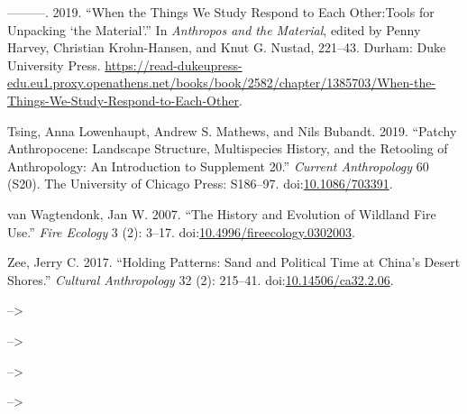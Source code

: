 \documentclass[
]{article}
\newlength{\cslhangindent}
\newenvironment{CSLReferences}[2] %
 {\begin{list}{}{%
  \setlength{\itemindent}{0pt}
  \setlength{\leftmargin}{0pt}
  \setlength{\parsep}{0pt}
  \ifodd #1
   \setlength{\leftmargin}{\cslhangindent}
   \setlength{\itemindent}{-1\cslhangindent}
  \fi
  \setlength{\itemsep}{#2\baselineskip}}}
 {\end{list}}
\begin{document}
\begin{CSLReferences}{1}{0}
---------. 2019. {``When the {Things We Study Respond} to {Each Other}:{Tools} for {Unpacking} {`the {Material}'}.''} In \emph{Anthropos and the {Material}}, edited by Penny Harvey, Christian Krohn-Hansen, and Knut G. Nustad, 221--43. Durham: Duke University Press. \url{https://read-dukeupress-edu.eu1.proxy.openathens.net/books/book/2582/chapter/1385703/When-the-Things-We-Study-Respond-to-Each-Other}.

Tsing, Anna Lowenhaupt, Andrew S. Mathews, and Nils Bubandt. 2019. {``Patchy {Anthropocene}: {Landscape Structure}, {Multispecies History}, and the {Retooling} of {Anthropology}: {An Introduction} to {Supplement} 20.''} \emph{Current Anthropology} 60 (S20). The University of Chicago Press: S186--97. doi:\href{https://doi.org/10.1086/703391}{10.1086/703391}.

van Wagtendonk, Jan W. 2007. {``The {History} and {Evolution} of {Wildland Fire Use}.''} \emph{Fire Ecology} 3 (2): 3--17. doi:\href{https://doi.org/10.4996/fireecology.0302003}{10.4996/fireecology.0302003}.

Zee, Jerry C. 2017. {``Holding {Patterns}: {Sand} and {Political Time} at {China}'s {Desert Shores}.''} \emph{Cultural Anthropology} 32 (2): 215--41. doi:\href{https://doi.org/10.14506/ca32.2.06}{10.14506/ca32.2.06}.

\end{CSLReferences}

\clearpage

\setlength{\parindent}{4em} 
\linespread{1}
\doublespacing

--\textgreater{}

--\textgreater{}

--\textgreater{}

--\textgreater{}
\end{document}
